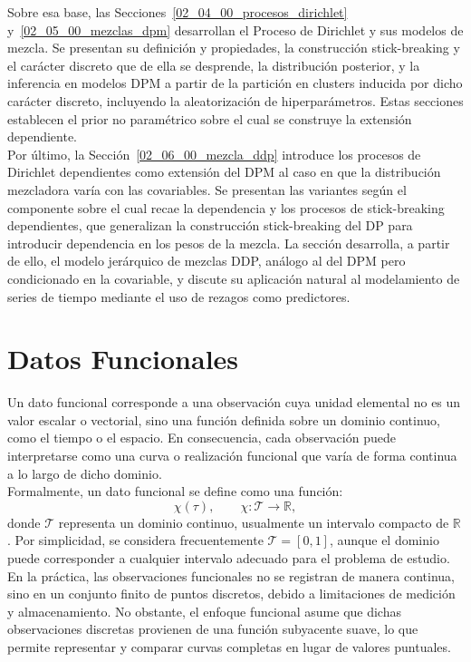 Sobre esa base, las Secciones~\ref{02_04_00_procesos_dirichlet} y~\ref{02_05_00_mezclas_dpm} desarrollan el Proceso de Dirichlet y sus modelos de mezcla. Se presentan su definición y propiedades, la construcción stick-breaking y el carácter discreto que de ella se desprende, la distribución posterior, y la inferencia en modelos DPM a partir de la partición en clusters inducida por dicho carácter discreto, incluyendo la aleatorización de hiperparámetros. Estas secciones establecen el prior no paramétrico sobre el cual se construye la extensión dependiente.\\

Por último, la Sección~\ref{02_06_00_mezcla_ddp} introduce los procesos de Dirichlet dependientes como extensión del DPM al caso en que la distribución mezcladora varía con las covariables. Se presentan las variantes según el componente sobre el cual recae la dependencia y los procesos de stick-breaking dependientes, que generalizan la construcción stick-breaking del DP para introducir dependencia en los pesos de la mezcla. La sección desarrolla, a partir de ello, el modelo jerárquico de mezclas DDP, análogo al del DPM pero condicionado en la covariable, y discute su aplicación natural al modelamiento de series de tiempo mediante el uso de rezagos como predictores.

\section{Datos Funcionales}
\label{02_01_00_datos_funcionales}
Un dato funcional corresponde a una observación cuya unidad elemental no es un valor escalar o vectorial, sino una función definida sobre un dominio continuo, como el tiempo o el espacio. En consecuencia, cada observación puede interpretarse como una curva o realización funcional que varía de forma continua a lo largo de dicho dominio.\\

Formalmente, un dato funcional se define como una función:
\begin{equation}
    \chi(\tau), \qquad \chi:\mathcal{T}\rightarrow\mathbb{R},
\end{equation}
donde $\mathcal{T}$ representa un dominio continuo, usualmente un intervalo compacto de $\mathbb{R}$. Por simplicidad, se considera frecuentemente $\mathcal{T}=[0,1]$, aunque el dominio puede corresponder a cualquier intervalo adecuado para el problema de estudio.\\

En la práctica, las observaciones funcionales no se registran de manera continua, sino en un conjunto finito de puntos discretos, debido a limitaciones de medición y almacenamiento. No obstante, el enfoque funcional asume que dichas observaciones discretas provienen de una función subyacente suave, lo que permite representar y comparar curvas completas en lugar de valores puntuales.\\

